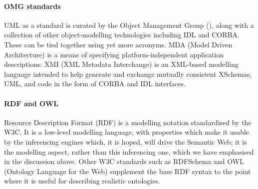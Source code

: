 \documentclass[11pt,twoside]{article}
\begin{document}
\paragraph{OMG standards}

UML as a standard is curated by the Object Management Group
(), along with
a collection of other object-modelling technologies including IDL and
CORBA.  These can be tied together using yet more acronyms.  MDA
(Model Driven Architecture) is a means of specifying
platform-independent application descriptions: XMI (XML Metadata Interchange) is an XML-based modelling
language intended to help generate and exchange mutually consistent
XSchemas, UML, and code in the form of CORBA and IDL interfaces.

\paragraph{RDF and OWL}

Resource Description Format (RDF) is a modelling notation standardised
by the W3C.  It is a low-level modelling language, with properties
which make it usable by the inferencing engines which, it is hoped,
will drive the Semantic Web; it is the modelling aspect, rather than
this inferencing one, which we have emphasised in the discussion
above.  Other W3C standards such as RDFSchema and OWL (Ontology
Language for the Web) supplement the base RDF syntax to the point
where it is useful for describing realistic ontologies.

\fi

\end{document}

